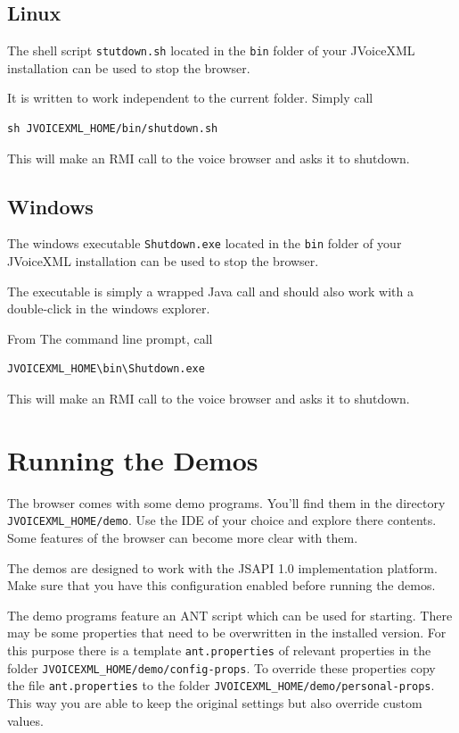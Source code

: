 \documentclass[11pt,a4paper]{article}
\begin{document}
\subsection{Linux}

The shell script \texttt{stutdown.sh} located in the \texttt{bin} folder
of your JVoiceXML installation can be used to stop the browser.

It is written to work independent to the current folder. Simply call

\begin{lstlisting}
sh JVOICEXML_HOME/bin/shutdown.sh
\end{lstlisting}

This will make an RMI call to the voice browser and asks it to shutdown.

\subsection{Windows}

The windows executable \texttt{Shutdown.exe} located in the \texttt{bin}
folder of your JVoiceXML installation can be used to stop the browser.

The executable is simply a wrapped Java call and should also work with a
double-click in the windows explorer.

From The command line prompt, call

\begin{lstlisting}
JVOICEXML_HOME\bin\Shutdown.exe
\end{lstlisting}

This will make an RMI call to the voice browser and asks it to shutdown.

\section{Running the Demos}

The browser comes with some demo programs. You'll find them in the
directory \texttt{JVOICEXML\_HOME/demo}. Use the IDE of your choice
and explore there contents. Some features of the browser can 
become more clear with them.

The demos are designed to work with the JSAPI 1.0 implementation platform. Make
sure that you have this configuration enabled before running the demos.

The demo programs feature an ANT script which can be used for starting.
There may be some properties that need to be overwritten in the installed
version. For this purpose there is a template \lstinline{ant.properties} of
relevant properties in the folder \lstinline{JVOICEXML_HOME/demo/config-props}.
To override these properties copy the file \texttt{ant.properties} to the
folder \lstinline{JVOICEXML_HOME/demo/personal-props}. This way you are able
to keep the original settings but also override custom values.
\end{document}

